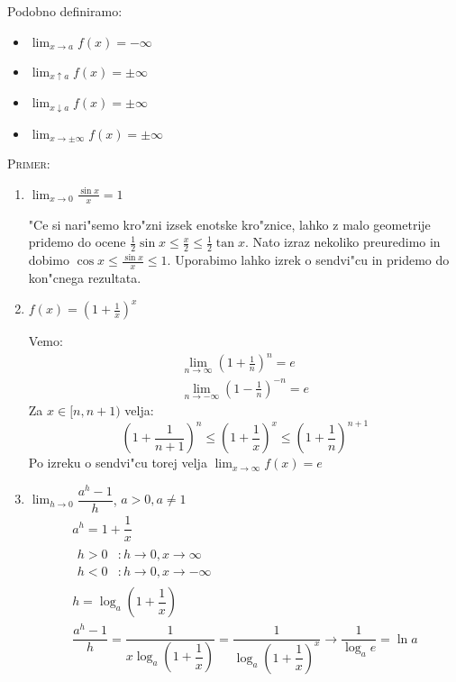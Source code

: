 Podobno definiramo:
\begin{itemize}
	\item $\lim_{x \to a} f(x) = -\infty$
	\item $\lim_{x \uparrow a} f(x) = \pm \infty$
	\item $\lim_{x \downarrow a} f(x) = \pm \infty$
	\item $\lim_{x \to \pm \infty} f(x) = \pm \infty$
\end{itemize}
%
\textsc{Primer:}
\begin{enumerate}[1)]
	\item $\lim_{x \to 0} \frac{\sin x}{x} = 1$

	"Ce si nari"semo kro"zni izsek enotske kro"znice, lahko z malo geometrije pridemo do ocene $\frac{1}{2} \sin x \leq \frac{x}{2} \leq \frac{1}{2} \tan x$. Nato izraz nekoliko preuredimo in dobimo $\cos x \leq \frac{\sin x}{x} \leq 1$. Uporabimo lahko izrek o sendvi"cu in pridemo do kon"cnega rezultata.
	
	\item $f(x) = (1 + \frac{1}{x}) ^ x$
	
	
	Vemo:
	\begin{gather*}
	\lim_{n \to \infty} \left(1 + \frac{1}{n}\right) ^ n = e \\
	\lim_{n \to -\infty} \left(1 - \frac{1}{n}\right) ^{-n} = e
	\end{gather*}
	Za $x \in [n, n+1)$ velja:
	\begin{equation*}
	\left(1 + \dfrac{1}{n+1}\right)^n \leq \left(1 + \dfrac{1}{x}\right)^x \leq \left(1 + \dfrac{1}{n}\right)^{n+1}
	\end{equation*}
	Po izreku o sendvi"cu torej velja $\lim_{x \to \infty} f(x) = e$
	
	\item $\lim_{h \to 0} \dfrac{a^h - 1}{h}$, $a > 0, a \neq 1$
	\begin{gather*}
	a^h = 1 + \dfrac{1}{x} \\
	\begin{aligned}
	h > 0 &: h \to 0, x \to \infty\\
	h < 0 &: h \to 0, x \to -\infty
	\end{aligned} \\
	h = \log_a \left(1 + \dfrac{1}{x}\right) \\
	\dfrac{a^h - 1}{h} = \dfrac{1}{x \log_a \left(1 + \dfrac{1}{x}\right)} = \dfrac{1}{\log_a \left(1 + \dfrac{1}{x}\right)^x} \to \dfrac{1}{\log_a e} = \ln a
	\end{gather*}
\end{enumerate}
%
